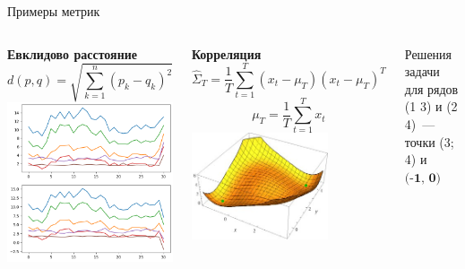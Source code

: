 \documentclass{beamer}
\begin{document}
\begin{frame}{Примеры метрик}
	\begin{columns}[c]
		\textbf{Евклидово расстояние}
		$$d(p,q)=\sqrt{\sum_{k=1}^n (p_k-q_k)^2}$$
		\includegraphics[width=1.0\textwidth]{EuclideanMetric}
		
		\textbf{Корреляция}
		$$
			\hat{\Sigma}_T = \frac{1}{T} \sum_{t=1}^{T} (x_t - \mu_T)(x_t - \mu_T)^T
		$$
		$$
			\mu_T = \frac{1}{T} \sum_{t=1}^{T} x_t
		$$
		\includegraphics[width=0.7\textwidth]{CorrelationError}
		
		Решения задачи для рядов (1 3) и (2 4)~--- точки (3; 4) и $\textbf{(-1, 0)}$
	\end{columns}
\end{frame}
\end{document}
